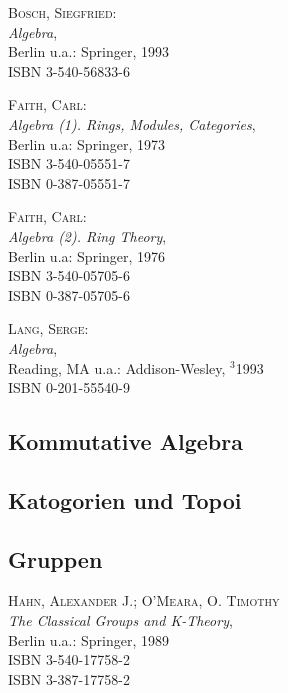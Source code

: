 \begin{description}

\item \textsc{Bosch, Siegfried}: \\
\textit{Algebra}, \\ 
Berlin u.a.: Springer, 1993 \\
ISBN 3-540-56833-6

\item \textsc{Faith, Carl}: \\
\textit{Algebra (1). Rings, Modules, Categories}, \\
Berlin u.a: Springer, 1973 \\
ISBN 3-540-05551-7 \\
ISBN 0-387-05551-7

\item \textsc{Faith, Carl}: \\
\textit{Algebra (2). Ring Theory}, \\
Berlin u.a: Springer, 1976 \\
ISBN 3-540-05705-6 \\
ISBN 0-387-05705-6

\item \textsc{Lang, Serge}: \\ 
\textit{Algebra}, \\
Reading, MA u.a.: Addison-Wesley, $^3$1993 \\
ISBN 0-201-55540-9

\end{description}

\subsection{Kommutative Algebra}

\subsection{Katogorien und Topoi}

\subsection{Gruppen}

\begin{description}

\item \textsc{Hahn, Alexander J.; O'Meara, O. Timothy} \\
\textit{The Classical Groups and K-Theory}, \\
Berlin u.a.: Springer, 1989 \\
ISBN 3-540-17758-2 \\
ISBN 3-387-17758-2

\end{description}

